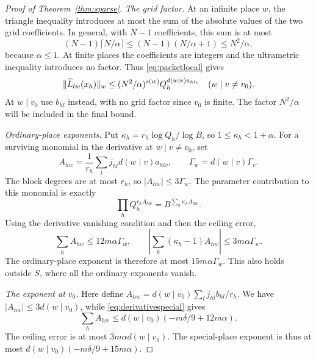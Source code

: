 \documentclass[11pt]{article}
\numberwithin{equation}{section}
\theoremstyle{remark}\newtheorem{remark}[theorem]{Remark}
\begin{document}
\begin{proof}[Proof of Theorem~\ref{thm:sparse}]
\emph{The grid factor.}
At an infinite place $w$, the triangle inequality introduces at most
the sum of the absolute values of the two grid coefficients.
In general, with $N-1$ coefficients, this sum is at most
\[
 (N-1)\lceil N/\alpha\rceil
 \le(N-1)(N/\alpha+1)\le N^2/\alpha,
\]
because $\alpha\le1$. At finite places the coefficients are integers
and the ultrametric inequality introduces no factor. Thus
\eqref{eq:packetlocal} gives
\begin{equation}\label{eq:gridfactor}
 \|\widehat L_{lw}(x_h)\|_w\le
 (N^2/\alpha)^{s(w)}Q_h^{d(w\mid v)a_{hlv}}
 \quad(w\mid v\ne v_0).
\end{equation}
At $w\mid v_0$ use $b_{hl}$ instead, with no grid factor since $v_0$
is finite. The factor $N^2/\alpha$ will be included in the final bound.

\emph{Ordinary-place exponents.}
Put $\kappa_h=r_h\log Q_h/\log B$, so $1\le\kappa_h<1+\alpha$.
For a surviving monomial in the derivative at $w\mid v\ne v_0$, set
\[
 A_{hw}=\frac1{r_h}\sum_lj_{hl}d(w\mid v)a_{hlv},\qquad
 \Gamma_w=d(w\mid v)\Gamma_v.
\]
The block degrees are at most $r_h$, so $|A_{hw}|\le3\Gamma_w$.
The parameter contribution to this monomial is exactly
\[
 \prod_hQ_h^{r_hA_{hw}}=B^{\sum_h\kappa_hA_{hw}}.
\]
Using the derivative vanishing condition and then the ceiling error,
\[
 \sum_hA_{hw}\le12m\alpha\Gamma_w,\qquad
 \left|\sum_h(\kappa_h-1)A_{hw}\right|
 \le3m\alpha\Gamma_w.
\]
The ordinary-place exponent is therefore at most
$15m\alpha\Gamma_w$. This also holds outside $S$, where all the
ordinary exponents vanish.

\emph{The exponent at $v_0$.}
Here define $A_{hw}=d(w\mid v_0)\sum_lj_{hl}b_{hl}/r_h$.
We have $|A_{hw}|\le3d(w\mid v_0)$, while
\eqref{eq:derivativespecial} gives
\[
 \sum_hA_{hw}\le d(w\mid v_0)(-m\delta/9+12m\alpha).
\]
The ceiling error is at most $3m\alpha d(w\mid v_0)$.
The special-place exponent is thus at most
$d(w\mid v_0)(-m\delta/9+15m\alpha)$.


\end{proof}
\end{document}
